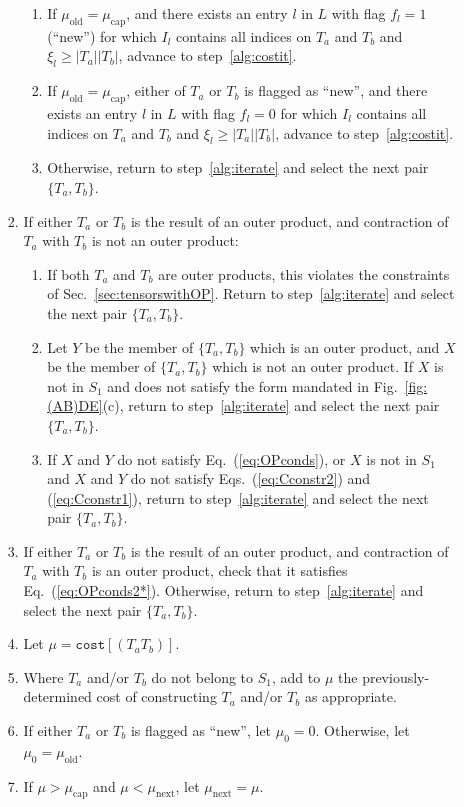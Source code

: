 \documentclass[aps,pre,reprint,superscriptaddress,amsfonts,amsmath,showpacs,nofootinbib,floatfix]{revtex4-1}
\newcommand{\mrm}[1]{\mathrm{#1}}
\newcommand{\Eref}[1]{Eq.~(\ref{#1})}
\newcommand{\Erefs}[2]{Eqs.~(\ref{#1}) and (\ref{#2})}
\newcommand{\fref}[1]{Fig.~\ref{#1}}
\newcommand{\sref}[1]{Sec.~\ref{#1}}
\newcommand{\ttt}[1]{\texttt{#1}}
\newcommand{\fuse}[2]{(#1#2)} %
\begin{document}
\begin{enumerate}
\begin{enumerate}
\begin{enumerate}
\begin{enumerate}
\item If $\mu_\mrm{old}=\mu_\mrm{cap}$, and there exists an entry $l$ in $L$ with flag $f_l=1$ (``new'') for which $I_l$ contains all indices on $T_a$ and $T_b$ and $\xi_l\geq |T_a||T_b|$, advance to step~\ref{alg:costit}.
\item If $\mu_\mrm{old}=\mu_\mrm{cap}$, either of $T_a$ or $T_b$ is flagged as ``new'', and there exists an entry $l$ in $L$ with flag $f_l=0$ for which $I_l$ contains all indices on $T_a$ and $T_b$ and $\xi_l\geq |T_a||T_b|$, advance to step~\ref{alg:costit}.
\item Otherwise, return to step~\ref{alg:iterate} and select the next pair $\{T_a,T_b\}$.
\end{enumerate}
\item If either $T_a$ or $T_b$ is the result of an outer product, and contraction of $T_a$ with $T_b$ is not an outer product:
\begin{enumerate}
\item If both $T_a$ and $T_b$ are outer products, this violates the constraints of \sref{sec:tensorswithOP}. Return to step~\ref{alg:iterate} and select the next pair $\{T_a,T_b\}$.
\item Let $Y$ be the member of $\{T_a,T_b\}$ which is an outer product, and $X$ be the member of $\{T_a,T_b\}$ which is not an outer product. If $X$ is not in $S_1$ and does not satisfy the form mandated in \fref{fig:(AB)DE}(c), return to step~\ref{alg:iterate} and select the next pair $\{T_a,T_b\}$.
\item If $X$ and $Y$ do not satisfy \Eref{eq:OPconds}, or $X$ is not in $S_1$ and $X$ and $Y$ do not satisfy \Erefs{eq:Cconstr2}{eq:Cconstr1}, return to step~\ref{alg:iterate} and select the next pair $\{T_a,T_b\}$.
\end{enumerate}
\item If either $T_a$ or $T_b$ is the result of an outer product, and contraction of $T_a$ with $T_b$ is an outer product, check that it satisfies \Eref{eq:OPconds2*}. Otherwise, return to step~\ref{alg:iterate} and select the next pair $\{T_a,T_b\}$.
\item Let $\mu=\ttt{cost}[\fuse{T_a}{T_b}]$.\label{alg:costit}
\item Where $T_a$ and/or $T_b$ do not belong to $S_1$, add to $\mu$ the previously-determined cost of constructing $T_a$ and/or $T_b$ as appropriate.
\item If either $T_a$ or $T_b$ is flagged as ``new'', let $\mu_0=0$. Otherwise, let $\mu_0=\mu_\mrm{old}$.
\item If $\mu>\mu_\mrm{cap}$ and $\mu<\mu_\mrm{next}$, let $\mu_\mrm{next}=\mu$.

\end{enumerate}
\end{enumerate}
\end{enumerate}
\end{document}
